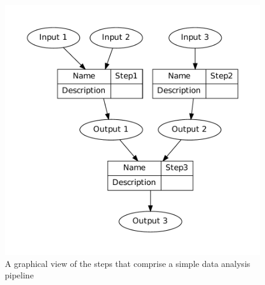 \documentclass[11pt,a4paper]{article}
\begin{document}
\begin{figure}[!ht]
\centering
\includegraphics[width=.5\textwidth]{images/fig-basic.pdf}
\caption{A graphical view of the steps that comprise a simple data analysis pipeline}
\label{fig:FigBasic}
\end{figure}

\clearpage
\renewcommand\refname{{References for appendix 2}} 
%
%
\end{document}
